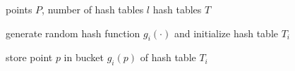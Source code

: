 \begin{algorithm}[H]
    \caption{BUILD-INDEX \cite{Gionis-Indyk-Motwani-1999}}
    \label{alg:lsh-1}
    \begin{algorithmic}[1]
        \Require points $P$, number of hash tables $l$
        \Ensure hash tables $T$
    
            \State generate random hash function $g_i(\cdot)$ and initialize hash table $T_i$
            
                \State store point $p$ in bucket $g_i(p)$ of hash table $T_i$
            \EndFor
        \EndFor
    \end{algorithmic}
\end{algorithm}